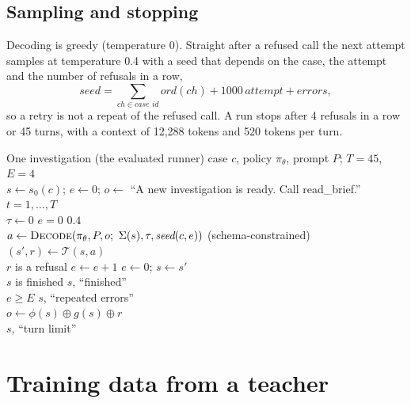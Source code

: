 \subsection{Sampling and stopping}
Decoding is greedy (temperature 0). Straight after a refused call the next attempt samples at temperature 0.4 with a
seed that depends on the case, the attempt and the number of refusals in a row,
\begin{equation}
  \textit{seed} = \sum_{ch \in \textit{case id}} \textit{ord}(ch) + 1000\,\textit{attempt} + \textit{errors},
\end{equation}
so a retry is not a repeat of the refused call. A run stops after 4 refusals in a row or 45 turns, with a context of
12{,}288 tokens and 520 tokens per turn.

\begin{algo}{One investigation (the evaluated runner)}\label{alg:run}
 case $c$, policy $\pi_\theta$, prompt $P$;  $T=45$, $E=4$\\
$s \gets s_0(c)$; $e \gets 0$; $o \gets$ ``A new investigation is ready. Call read\_brief.''\\
 $t = 1,\dots,T$ \\
\hspace*{1.2em} $\tau \gets 0$  $e = 0$  $0.4$\\
\hspace*{1.2em} $a \gets \textsc{Decode}(\pi_\theta, P, o;\ \Sigma(s), \tau, \textit{seed}(c, e))$ \hfill (schema-constrained)\\
\hspace*{1.2em} $(s', r) \gets \mathcal{T}(s, a)$\\
\hspace*{1.2em}  $r$ is a refusal  $e \gets e + 1$  $e \gets 0$; $s \gets s'$\\
\hspace*{1.2em}  $s$ is finished  $s$, ``finished''\\
\hspace*{1.2em}  $e \ge E$  $s$, ``repeated errors''\\
\hspace*{1.2em} $o \gets \phi(s) \oplus g(s) \oplus r$\\
 $s$, ``turn limit''
\end{algo}

\section{Training data from a teacher}\label{sec:data}

